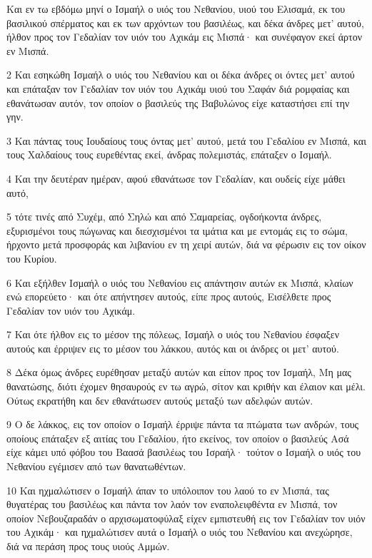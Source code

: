 \par Και εν τω εβδόμω μηνί ο Ισμαήλ ο υιός του Νεθανίου, υιού του Ελισαμά, εκ του βασιλικού σπέρματος και εκ των αρχόντων του βασιλέως, και δέκα άνδρες μετ' αυτού, ήλθον προς τον Γεδαλίαν τον υιόν του Αχικάμ εις Μισπά· και συνέφαγον εκεί άρτον εν Μισπά.
\par 2 Και εσηκώθη Ισμαήλ ο υιός του Νεθανίου και οι δέκα άνδρες οι όντες μετ' αυτού και επάταξαν τον Γεδαλίαν τον υιόν του Αχικάμ υιού του Σαφάν διά ρομφαίας και εθανάτωσαν αυτόν, τον οποίον ο βασιλεύς της Βαβυλώνος είχε καταστήσει επί την γην.
\par 3 Και πάντας τους Ιουδαίους τους όντας μετ' αυτού, μετά του Γεδαλίου εν Μισπά, και τους Χαλδαίους τους ευρεθέντας εκεί, άνδρας πολεμιστάς, επάταξεν ο Ισμαήλ.
\par 4 Και την δευτέραν ημέραν, αφού εθανάτωσε τον Γεδαλίαν, και ουδείς είχε μάθει αυτό,
\par 5 τότε τινές από Συχέμ, από Σηλώ και από Σαμαρείας, ογδοήκοντα άνδρες, εξυρισμένοι τους πώγωνας και διεσχισμένοι τα ιμάτια και με εντομάς εις το σώμα, ήρχοντο μετά προσφοράς και λιβανίου εν τη χειρί αυτών, διά να φέρωσιν εις τον οίκον του Κυρίου.
\par 6 Και εξήλθεν Ισμαήλ ο υιός του Νεθανίου εις απάντησιν αυτών εκ Μισπά, κλαίων ενώ επορεύετο· και ότε απήντησεν αυτούς, είπε προς αυτούς, Εισέλθετε προς Γεδαλίαν τον υιόν του Αχικάμ.
\par 7 Και ότε ήλθον εις το μέσον της πόλεως, Ισμαήλ ο υιός του Νεθανίου έσφαξεν αυτούς και έρριψεν εις το μέσον του λάκκου, αυτός και οι άνδρες οι μετ' αυτού.
\par 8 Δέκα όμως άνδρες ευρέθησαν μεταξύ αυτών και είπον προς τον Ισμαήλ, Μη μας θανατώσης, διότι έχομεν θησαυρούς εν τω αγρώ, σίτον και κριθήν και έλαιον και μέλι. Ούτως εκρατήθη και δεν εθανάτωσεν αυτούς μεταξύ των αδελφών αυτών.
\par 9 Ο δε λάκκος, εις τον οποίον ο Ισμαήλ έρριψε πάντα τα πτώματα των ανδρών, τους οποίους επάταξεν εξ αιτίας του Γεδαλίου, ήτο εκείνος, τον οποίον ο βασιλεύς Ασά είχε κάμει υπό φόβου του Βαασά βασιλέως του Ισραήλ· τούτον ο Ισμαήλ ο υιός του Νεθανίου εγέμισεν από των θανατωθέντων.
\par 10 Και ηχμαλώτισεν ο Ισμαήλ άπαν το υπόλοιπον του λαού το εν Μισπά, τας θυγατέρας του βασιλέως και πάντα τον λαόν τον εναπολειφθέντα εν Μισπά, τον οποίον Νεβουζαραδάν ο αρχισωματοφύλαξ είχεν εμπιστευθή εις τον Γεδαλίαν τον υιόν του Αχικάμ· και ηχμαλώτισεν αυτά ο Ισμαήλ ο υιός του Νεθανίου και ανεχώρησε, διά να περάση προς τους υιούς Αμμών.
